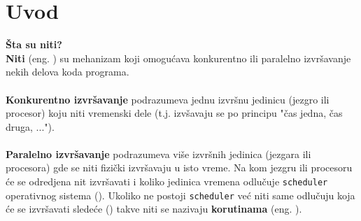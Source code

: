 \section{Uvod}
\textbf{\v{S}ta su niti?}\\
\textbf{Niti} (eng. ) su mehanizam koji omogu\'{c}ava konkurentno ili paralelno izvr\v{s}avanje nekih delova koda programa.\\\\
\textbf{Konkurentno izvr\v{s}avanje} podrazumeva jednu izvr\v{s}nu jedinicu (jezgro ili procesor) koju niti vremenski dele (t.j. izv\v{s}avaju se po principu "\v{c}as jedna, \v{c}as druga, ..."). \\\\
\textbf{Paralelno izvr\v{s}avanje} podrazumeva vi\v{s}e izvr\v{s}nih jedinica (jezgara ili procesora) gde se niti fizi\v{c}ki izvr\v{s}avaju u isto vreme. Na kom jezgru ili procesoru \'{c}e se odredjena nit izvr\v{s}avati i koliko jedinica vremena odlu\v{c}uje \texttt{scheduler} operativnog sistema (). Ukoliko ne postoji \texttt{scheduler} ve\'{c} niti same odlu\v{c}uju koja \'{c}e se izvr\v{s}avati slede\'{c}e () takve niti se nazivaju \textbf{korutinama} (eng. ).

